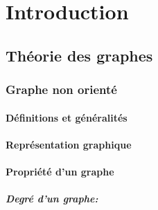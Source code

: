 \documentclass[11pt,a4paper]{report}
\begin{document}







\tableofcontents
\newpage

\listoffigures
{}
\cleardoublepage


\listoftables
{}
\cleardoublepage



\part{Introduction} 


	\chapter{ Théorie des graphes}
	
	
	\section{Graphe non orienté}
		\subsection{Définitions et généralités}
		\subsection{Représentation graphique}
		\subsection{Propriété d'un graphe} %
			\subsubsection{Degré d'un graphe:} %
\end{document}
